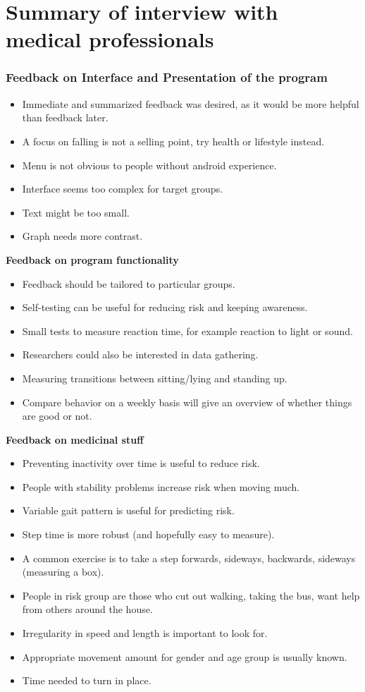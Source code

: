 \section{Summary of interview with medical professionals}

\subsubsection*{Feedback on Interface and Presentation of the program}
\begin{itemize}
\item Immediate and summarized feedback was desired, as it would be more helpful than feedback later.
\item A focus on falling is not a selling point, try health or lifestyle instead.
\item Menu is not obvious to people without android experience.
\item Interface seems too complex for target groups.
\item Text might be too small.
\item Graph needs more contrast. 

\end{itemize}

\textbf{Feedback on program functionality}
\begin{itemize}
\item Feedback should be tailored to particular groups.
\item Self-testing can be useful for reducing risk and keeping awareness.
\item Small tests to measure reaction time, for example reaction to light or sound.
\item Researchers could also be interested in data gathering.
\item Measuring transitions between sitting/lying and standing up.
\item Compare behavior on a weekly basis will give an overview of whether things are good or not.
\end{itemize}

\textbf{Feedback on medicinal stuff}
\begin{itemize}
\item Preventing inactivity over time is useful to reduce risk.
\item People with stability problems increase risk when moving much.
\item Variable gait pattern is useful for predicting risk.
\item Step time is more robust (and hopefully easy to measure).
\item A common exercise is to take a step forwards, sideways, backwards, sideways (measuring a box).
\item People in risk group are those who cut out walking, taking the bus, want help from others around the house.
\item Irregularity in speed and length is important to look for.
\item Appropriate movement amount for gender and age group is usually known.
\item Time needed to turn in place.
\end{itemize}